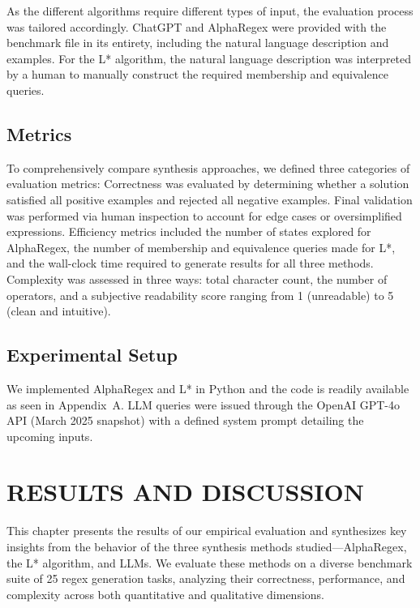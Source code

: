 \indent\indent As the different algorithms require different types of input, the evaluation process was tailored accordingly. ChatGPT and AlphaRegex were provided with the benchmark file in its entirety, including the natural language description and examples. For the L* algorithm, the natural language description was interpreted by a human to manually construct the required membership and equivalence queries.

\section{Metrics}

\indent\indent To comprehensively compare synthesis approaches, we defined three categories of evaluation metrics:
Correctness was evaluated by determining whether a solution satisfied all positive examples and rejected all negative examples. Final validation was performed via human inspection to account for edge cases or oversimplified expressions. Efficiency metrics included the number of states explored for AlphaRegex, the number of membership and equivalence queries made for L*, and the wall-clock time required to generate results for all three methods. Complexity was assessed in three ways: total character count, the number of operators, and a subjective readability score ranging from 1 (unreadable) to 5 (clean and intuitive).

\section{Experimental Setup}

\indent\indent We implemented AlphaRegex and L* in Python and the code is readily available as seen in Appendix~A. LLM queries were issued through the OpenAI GPT-4o API (March 2025 snapshot) with a defined system prompt detailing the upcoming inputs.

\chapter{RESULTS AND DISCUSSION}

\indent\indent This chapter presents the results of our empirical evaluation and synthesizes key insights from the behavior of the three synthesis methods studied—AlphaRegex, the L* algorithm, and LLMs. We evaluate these methods on a diverse benchmark suite of 25 regex generation tasks, analyzing their correctness, performance, and complexity across both quantitative and qualitative dimensions.

